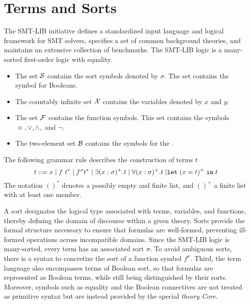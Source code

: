 \section{Terms and Sorts}

The SMT-LIB initiative \cite{smtlib} defines a standardized input language and logical framework for SMT solvers, specifies a set of common background theories, and maintains an extensive collection of benchmarks.
The SMT-LIB logic is a many-sorted first-order logic with equality.

\begin{itemize}
    \item The set $\cal{S}$ contains the sort symbols denoted by $\sigma$. The set contains the symbol  for Booleans.
    \item The countably infinite set $\cal{X}$ contains the variables denoted by $x$ and $y$.
    \item The set $\cal{F}$ contains the function symbols. This set contains the symbols $\approx, \lor, \land,$ and $\neg$.
    \item The two-element set $\cal{B}$ contains the symbols for the .
\end{itemize}


\begin{definition}[Terms]\label{def:smt-grammar}
The following grammar rule describes the construction of terms $t$
\begin{equation*}
t ::= x \pipe f~t^* \pipe f^\sigma t^* \pipe \exists (x: \sigma)^+. t \pipe \forall (x: \sigma)^+. t \pipe \mathrel{\kw{let}} (x = t)^+ \mathrel{\kw{in}} t
\end{equation*}
The notation $()^*$ denotes a possibly empty and finite list, and $()^+$ a finite list with at least one member.
\end{definition}

A sort designates the logical type associated with terms, variables, and functions, thereby defining the domain of discourse within a given theory.
Sorts provide the formal structure necessary to ensure that formulas are well-formed, preventing ill-formed operations across incompatible domains.
Since the SMT-LIB logic is many-sorted, every term has an associated sort $\sigma$.
To avoid ambiguous sorts, there is a syntax to concretize the sort of a function symbol $f^\sigma$.
Third, the term language also encompasses terms of Boolean sort, so that formulas are represented as Boolean terms, while still being distinguished by their sorts.
Moreover, symbols such as equality and the Boolean connectives are not treated as primitive syntax but are instead provided by the special \emph{theory Core}.


